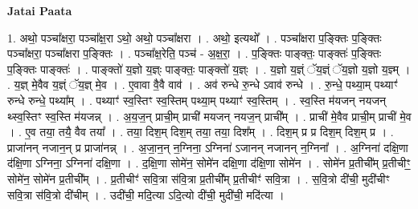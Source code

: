 \documentclass[17pt]{extarticle}
\begin{document}
\textbf{Jatai Paata} \newline

1. अथो॒ पञ्चा᳚क्षरा॒ पञ्चा᳚क्ष॒रा ऽथो॒ अथो॒ पञ्चा᳚क्षरा । . अथो॒ इत्यथो᳚ । . पञ्चा᳚क्षरा प॒ङ्क्तिः प॒ङ्क्तिः पञ्चा᳚क्षरा॒ पञ्चा᳚क्षरा प॒ङ्क्तिः । . पञ्चा᳚क्ष॒रेति॒ पञ्च॑ - अ॒क्ष॒रा॒ । . प॒ङ्क्तिः पाङ्क्तः॒ पाङ्क्तः॑ प॒ङ्क्तिः प॒ङ्क्तिः पाङ्क्तः॑ । . पाङ्क्तो॑ य॒ज्ञो य॒ज्ञ्ः पाङ्क्तः॒ पाङ्क्तो॑ य॒ज्ञ्ः । . य॒ज्ञो य॒ज्ञ्ं ॅय॒ज्ञ्ं ॅय॒ज्ञो य॒ज्ञो य॒ज्ञ्म् । . य॒ज्ञ् मे॒वैव य॒ज्ञ्ं ॅय॒ज्ञ् मे॒व । . ए॒वावा वै॒वै वाव॑ । . अव॑ रुन्धे रु॒न्धे ऽवाव॑ रुन्धे । . रु॒न्धे॒ पथ्या॒म् पथ्याꣳ॑ रुन्धे रुन्धे॒ पथ्या᳚म् । . पथ्याꣳ॑ स्व॒स्तिꣳ स्व॒स्तिम् पथ्या॒म् पथ्याꣳ॑ स्व॒स्तिम् । . स्व॒स्ति म॑यजन् नयजन् थ्स्व॒स्तिꣳ स्व॒स्ति म॑यजन्न् । . अ॒य॒ज॒न् प्राची॒म् प्राची॑ मयजन् नयज॒न् प्राची᳚म् । . प्राची॑ मे॒वैव प्राची॒म् प्राची॑ मे॒व । . ए॒व तया॒ तयै॒ वैव तया᳚ । . तया॒ दिश॒म् दिश॒म् तया॒ तया॒ दिश᳚म् । . दिश॒म् प्र प्र दिश॒म् दिश॒म् प्र । . प्राजा॑नन् नजान॒न् प्र प्राजा॑नन्न् । . अ॒जा॒न॒न् न॒ग्निना॒ ऽग्निना॑ ऽजानन् नजानन् न॒ग्निना᳚ । . अ॒ग्निना॑ दक्षि॒णा द॑क्षि॒णा ऽग्निना॒ ऽग्निना॑ दक्षि॒णा । . द॒क्षि॒णा सोमे॑न॒ सोमे॑न दक्षि॒णा द॑क्षि॒णा सोमे॑न । . सोमे॑न प्र॒तीची᳚म् प्र॒तीचीꣳ॒॒ सोमे॑न॒ सोमे॑न प्र॒तीची᳚म् । . प्र॒तीचीꣳ॑ सवि॒त्रा स॑वि॒त्रा प्र॒तीची᳚म् प्र॒तीचीꣳ॑ सवि॒त्रा । . स॒वि॒त्रो दी॑ची॒ मुदी॑चीꣳ सवि॒त्रा स॑वि॒त्रो दी॑चीम् । . उदी॑ची॒ मदि॒त्या ऽदि॒त्यो दी॑ची॒ मुदी॑ची॒ मदि॑त्या । \newline
\end{document}
